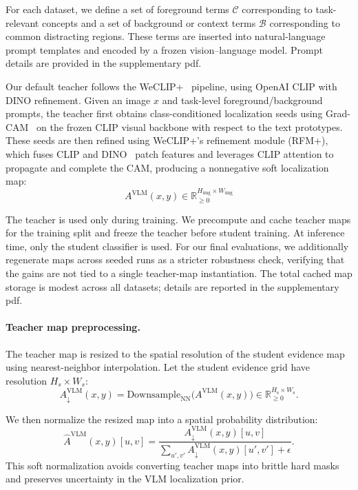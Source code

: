For each dataset, we define a set of foreground terms $\mathcal{C}$ corresponding to task-relevant concepts and a set of background or context terms $\mathcal{B}$ corresponding to common distracting regions. These terms are inserted into natural-language prompt templates and encoded by a frozen vision--language model. Prompt details are provided in the supplementary pdf.

Our default teacher follows the WeCLIP+~\cite{zhang2024frozen} pipeline, using OpenAI CLIP with DINO refinement. Given an image $x$ and task-level foreground/background prompts, the teacher first obtains class-conditioned localization seeds using Grad-CAM~\cite{selvaraju2017grad} on the frozen CLIP visual backbone with respect to the text prototypes. These seeds are then refined using WeCLIP+'s refinement module (RFM+), which fuses CLIP and DINO~\cite{caron2021emerging} patch features and leverages CLIP attention to propagate and complete the CAM, producing a nonnegative soft localization map:
\begin{equation}
A^{\mathrm{VLM}}(x,y)\in\mathbb{R}^{H_{\mathrm{img}}\times W_{\mathrm{img}}}_{\ge 0}
\end{equation}

The teacher is used only during training. We precompute and cache teacher maps for the training split and freeze the teacher before student training. At inference time, only the student classifier is used. For our final evaluations, we additionally regenerate maps across seeded runs as a stricter robustness check, verifying that the gains are not tied to a single teacher-map instantiation. The total cached map storage is modest across all datasets; details are reported in the supplementary pdf.


\paragraph{Teacher map preprocessing.}
The teacher map is resized to the spatial resolution of the student evidence map using nearest-neighbor interpolation. Let the student evidence grid have resolution $H_s\times W_s$:
\begin{equation}
A^{\mathrm{VLM}}_{\downarrow}(x,y)
=
\mathrm{Downsample}_{\mathrm{NN}}\big(A^{\mathrm{VLM}}(x,y)\big)
\in
\mathbb{R}^{H_{\mathrm{s}}\times W_{\mathrm{s}}}_{\ge 0}.
\end{equation}

We then normalize the resized map into a spatial probability distribution:
\begin{equation}
\hat{A}^{\mathrm{VLM}}(x,y)[u,v]
=
\frac{A^{\mathrm{VLM}}_{\downarrow}(x,y)[u,v]}{\sum_{u',v'} A^{\mathrm{VLM}}_{\downarrow}(x,y)[u',v']+\epsilon}.
\end{equation}
This soft normalization avoids converting teacher maps into brittle hard masks and preserves uncertainty in the VLM localization prior.

